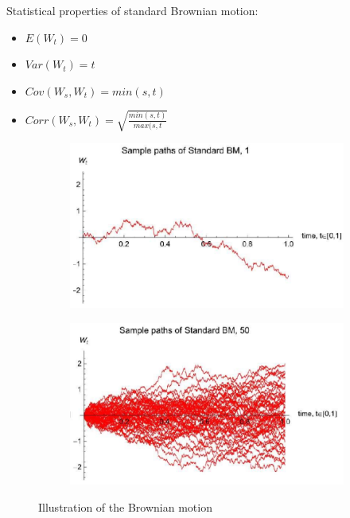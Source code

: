 \documentclass[11pt,a4paper]{book}
\theoremstyle{definition}\newtheorem{definition}{Definition}
\theoremstyle{definition}\newtheorem{fact}{Fact}
\theoremstyle{definition}\newtheorem{remark}{Remark}
\theoremstyle{definition}\newtheorem{ex}{Ex.}
\theoremstyle{definition}\newtheorem{project}{Project}
\theoremstyle{definition}\newtheorem{problem}{Problem}
\theoremstyle{definition}\newtheorem{example}{Example}
\numberwithin{theorem}{section}
\numberwithin{corollary}{chapter}
\numberwithin{assumption}{chapter}
\numberwithin{definition}{chapter}
\numberwithin{prop}{chapter}
\numberwithin{notation}{chapter}
\numberwithin{problem}{chapter}
\numberwithin{example}{chapter}
\numberwithin{fact}{chapter}
\numberwithin{ex}{chapter}
\begin{document}
Statistical properties of standard Brownian motion:
\begin{itemize}
\item $E(W_t) = 0$
\item $Var(W_t) = t$
\item $Cov(W_s, W_t) = min(s,t)$
\item $Corr(W_s, W_t) = \sqrt{\frac{min(s,t)}{max(s,t}}$
\end{itemize}

\begin{figure}[H]
	\begin{subfigure}{0.5\textwidth}
		\centering
		\includegraphics[scale=0.5]{Chapter01/Chapter1_2.png}
	\end{subfigure}
	\begin{subfigure}{0.5\textwidth}
		\centering
		\includegraphics[scale=0.5]{Chapter01/Chapter1_3.png}
	\end{subfigure}
	\caption{Illustration of the Brownian motion}
\end{figure}
\end{document}
